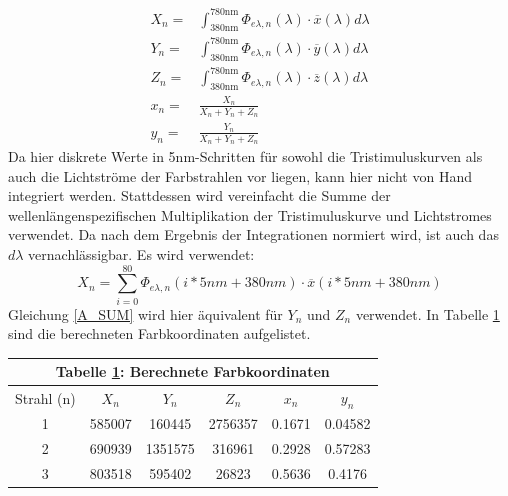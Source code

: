 \begin{eqnarray}
X_n = & \int_{\mbox{380nm}}^{\mbox{780nm}} \Phi_{e\lambda,n}(\lambda)\cdot \overline{x}(\lambda)d\lambda \\
Y_n = & \int_{\mbox{380nm}}^{\mbox{780nm}} \Phi_{e\lambda,n}(\lambda)\cdot \overline{y}(\lambda)d\lambda \\
Z_n = & \int_{\mbox{380nm}}^{\mbox{780nm}} \Phi_{e\lambda,n}(\lambda)\cdot \overline{z}(\lambda)d\lambda \\
x_n = & \frac{X_n}{X_n+Y_n+Z_n} \\
y_n = & \frac{Y_n}{X_n+Y_n+Z_n}
\end{eqnarray}
Da hier diskrete Werte in 5nm-Schritten für sowohl die Tristimuluskurven als auch die Lichtströme der Farbstrahlen vor liegen, kann hier nicht von Hand integriert werden. Stattdessen wird vereinfacht die Summe der wellenlängenspezifischen Multiplikation der Tristimuluskurve und Lichtstromes verwendet. Da nach dem Ergebnis der Integrationen normiert wird, ist auch das $d\lambda$ vernachlässigbar. Es wird verwendet:
\begin{equation}
X_n = \sum_{i=0}^{80} \Phi_{e\lambda,n}(i*5nm + 380nm) \cdot \overline{x}(i*5nm + 380nm)
\label{A_SUM}
\end{equation}
Gleichung \ref{A_SUM} wird hier äquivalent für $Y_n$ und $Z_n$ verwendet. In Tabelle \ref{A_COORDS} sind die berechneten Farbkoordinaten aufgelistet.

\begin{table}[h]
\label{A_COORDS}
\centering
\begin{tabular}{| c | c | c | c | c | c |}
\hline
\multicolumn{6}{|c|}{Tabelle \ref{A_COORDS}: Berechnete Farbkoordinaten} \\
\hline
Strahl (n) & $X_n$ & $Y_n$ & $Z_n$ & $x_n$ & $y_n$ \\
\hline
1 & 585007 & 160445 & 2756357 & 0.1671 & 0.04582 \\
2 & 690939 & 1351575 & 316961 & 0.2928 & 0.57283 \\
3 & 803518 & 595402 & 26823 & 0.5636 & 0.4176 \\
\hline
\end{tabular}
\end{table}